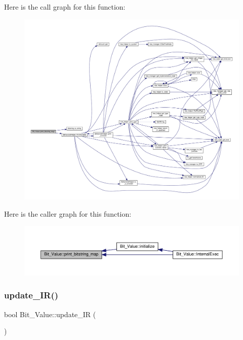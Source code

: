 Here is the call graph for this function\+:
\nopagebreak
\begin{figure}[H]
\begin{center}
\leavevmode
\includegraphics[width=350pt]{df/d4b/classBit__Value_a680cd4a8faa401adb3262c2cfd8fc06f_cgraph}
\end{center}
\end{figure}
Here is the caller graph for this function\+:
\nopagebreak
\begin{figure}[H]
\begin{center}
\leavevmode
\includegraphics[width=350pt]{df/d4b/classBit__Value_a680cd4a8faa401adb3262c2cfd8fc06f_icgraph}
\end{center}
\end{figure}
\mbox{\label{classBit__Value_a2c7439f99c654aefc5ebf88e517fa6e6}} 
\subsubsection{\texorpdfstring{update\+\_\+\+I\+R()}{update\_IR()}}
{\footnotesize\ttfamily bool Bit\+\_\+\+Value\+::update\+\_\+\+IR (\begin{DoxyParamCaption}{ }\end{DoxyParamCaption})\hspace{0.3cm}{\ttfamily [private]}}



